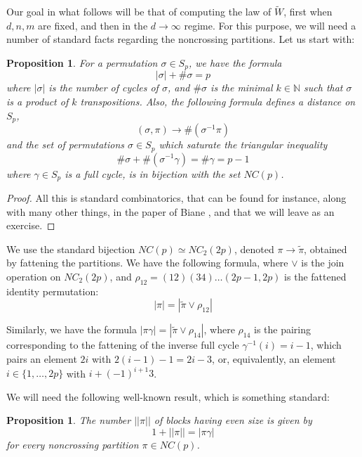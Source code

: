 \documentclass[12pt]{amsbook}
\newtheorem{proposition}[theorem]{Proposition}
\begin{document}
Our goal in what follows will be that of computing the law of $\widetilde{W}$, first when $d,n,m$ are fixed, and then in the $d\to\infty$ regime. For this purpose, we will need a number of standard facts regarding the noncrossing partitions. Let us start with:

\begin{proposition}
For a permutation $\sigma\in S_p$, we have the formula
$$|\sigma|+\#\sigma=p$$
where $|\sigma|$ is the number of cycles of $\sigma$, and $\#\sigma$ is the minimal $k\in\mathbb N$ such that $\sigma$ is a product of $k$ transpositions. Also, the following formula defines a distance on $S_p$, 
$$(\sigma,\pi)\to\#(\sigma^{-1}\pi)$$
and the set of permutations $\sigma\in S_p$ which saturate the triangular inequality 
$$\#\sigma+\#(\sigma^{-1}\gamma)=\#\gamma=p-1$$
where $\gamma\in S_p$ is a full cycle, is in bijection with the set $NC(p)$. 
\end{proposition}

\begin{proof}
All this is standard combinatorics, that can be found for instance, along with many other things, in the paper of Biane \cite{bia}, and that we will leave as an exercise.
\end{proof}

We use the standard bijection $NC(p)\simeq NC_2(2p)$, denoted $\pi\to\widetilde{\pi}$, obtained by fattening the partitions. We have the following formula,  where $\vee$ is the join operation on $NC_2(2p)$, and $\rho_{12} = (12)(34)\ldots(2p-1,2p)$ is the fattened identity permutation:
$$|\pi|=|\widetilde{\pi}\vee\rho_{12}|$$

Similarly, we have the formula $|\pi\gamma|=|\widetilde{\pi}\vee\rho_{14}|$, where $\rho_{14}$ is the pairing corresponding to the fattening of the inverse full cycle $\gamma^{-1}(i) = i-1$, which pairs an element $2i$ with $2(i-1)-1 = 2i-3$, or, equivalently, an element $i \in \{1, \ldots, 2p\}$ with $i+(-1)^{i+1}3$. 

\bigskip

We will need the following well-known result, which is something standard:

\begin{proposition}
The number $||\pi||$ of blocks having even size is given by
$$1+||\pi||=|\pi\gamma|$$
for every noncrossing partition $\pi \in NC(p)$.
\end{proposition}
\end{document}
